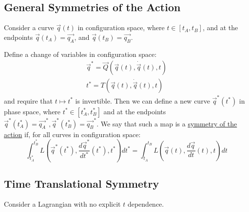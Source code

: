 \documentclass[../Main.tex]{subfiles}
\begin{document}
\subsection{General Symmetries of the Action}
Consider a curve $\vec{q}(t)$ in configuration space, where $t \in [t_A, t_B]$, and at the endpoints $\vec{q}(t_A) = \vec{q_A}$, and $\vec{q}(t_B) = \vec{q_B}$.

Define a change of variables in configuration space:
\begin{align*}
    \vec{q}^* = \vec{Q}(\vec{q}(t), \dot{\vec{q}}(t), t) \\
    t^* = T(\vec{q}(t), \dot{\vec{q}}(t), t)
\end{align*}
and require that $t \mapsto t^*$ is invertible. Then we can define a new curve $\vec{q}^*(t^*)$ in phase space, where $t^* \in [t_A^*, t_B^*]$ and at the endpoints $\vec{q}^*(t_A^*) = \vec{q_A}^*, \vec{q}^*(t_B^*) = \vec{q_B}^* $. We say that such a map is a \underline{symmetry of the action} if, for all curves in configuration space:
\begin{equation}
    \int_{t_A^*}^{t_B^*} L(\vec{q}^*(t^*), \frac{d\vec{q}^*}{dt^*}(t^*), t^*) dt^* = \int_{t_A}^{t_B} L(\vec{q}(t), \frac{d\vec{q}}{dt}(t), t) dt
    \label{eqnActionSymmetry}
\end{equation}
\subsection{Time Translational Symmetry}
Consider a Lagrangian with no explicit $t$ dependence.
\end{document}
